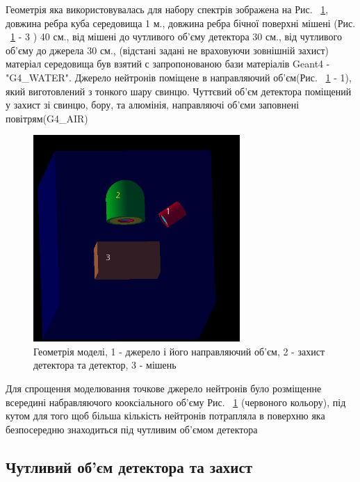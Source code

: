 \documentclass[a4paper, 14pt]{article}
\numberwithin{equation}{section}
\numberwithin{table}{section}
\begin{document}
Геометрія яка використовувалась для набору спектрів зображена на Рис. ~\ref{ris:Geometry}, довжина ребра куба середовища 1 м., довжина ребра бічної поверхні мішені (Рис. ~\ref{ris:Geometry} - 3 ) 40 см., від мішені до чутливого об'єму детектора 30 см., від чутливого об'єму до джерела 30 см., (відстані задані не враховуючи зовнішній захист) матеріал середовища був взятий с запропонованою бази матеріалів Geant4 - "G4\_WATER". Джерело нейтронів поміщене в направляючий об'єм(Рис. ~\ref{ris:Geometry} - 1), який виготовлений з тонкого шару свинцю. Чуттєвий об'єм детектора поміщений у захист зі свинцю, бору, та алюмінія, направляючі об'єми заповнені повітрям(G4\_AIR)
\begin{figure}[hbt!]
	\centering \includegraphics[width=0.7\textwidth]{images/geometryAll.png}
	\caption{Геометрія моделі, 1 - джерело і його направляючий об'єм, 2 - захист детектора та детектор, 3 - мішень} 
	\label{ris:Geometry}	
\end{figure}

Для спрощення моделювання точкове джерело нейтронів було розміщенне всередині набравляючого кооксіального об'єму Рис. ~\ref{ris:Geometry} (червоного кольору), під кутом для того щоб більша кількість нейтронів потрапляла в поверхню яка безпосередню знаходиться під чутливим об'ємом детектора 
	
	
	\subsection{Чутливий об'єм детектора та захист}
	
\end{document}
